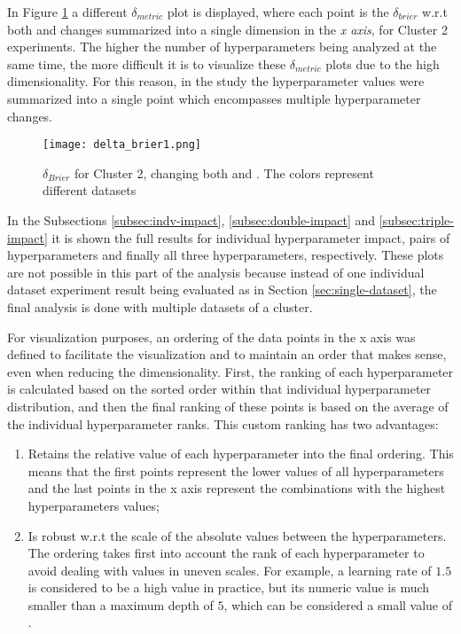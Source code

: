 In Figure \ref{fig:delta-brier1} a different $\delta_{metric}$ plot is displayed, where each point is the $\delta_{brier}$ w.r.t both  and  changes summarized into a single dimension in the \textit{x axis}, for Cluster 2 experiments. The higher the number of hyperparameters being analyzed at the same time, the more difficult it is to visualize these $\delta_{metric}$ plots due to the high dimensionality. For this reason, in the study the hyperparameter values were summarized into a single point which encompasses multiple hyperparameter changes.

\begin{figure}[!h]
    \centering
    \texttt{[image: delta\_brier1.png]}
    \caption{$\delta_{Brier}$ for Cluster 2, changing both  and . The colors represent different datasets}
    \label{fig:delta-brier1}
\end{figure}


In the Subsections \ref{subsec:indv-impact}, \ref{subsec:double-impact} and \ref{subsec:triple-impact} it is shown the full results for individual hyperparameter impact, pairs of hyperparameters and finally all three hyperparameters, respectively. These plots are not possible in this part of the analysis because instead of one individual dataset experiment result being evaluated as in Section \ref{sec:single-dataset}, the final analysis is done with multiple datasets of a cluster.

For visualization purposes, an ordering of the data points in the x axis was defined to facilitate the visualization and to maintain an order that makes sense, even when reducing the dimensionality. First, the ranking of each hyperparameter is calculated based on the sorted order within that individual hyperparameter distribution, and then the final ranking of these points is based on the average of the individual hyperparameter ranks. This custom ranking has two advantages:

\begin{enumerate}
    \item Retains the relative value of each hyperparameter into the final ordering. This means that the first points represent the lower values of all hyperparameters and the last points in the x axis represent the combinations with the highest hyperparameters values;
    \item Is robust w.r.t the scale of the absolute values between the hyperparameters. The ordering takes first into account the rank of each hyperparameter to avoid dealing with values in uneven scales. For example, a learning rate of $1.5$ is considered to be a high value in practice, but its numeric value is much smaller than a maximum depth of $5$, which can be considered a small value of .
\end{enumerate}


